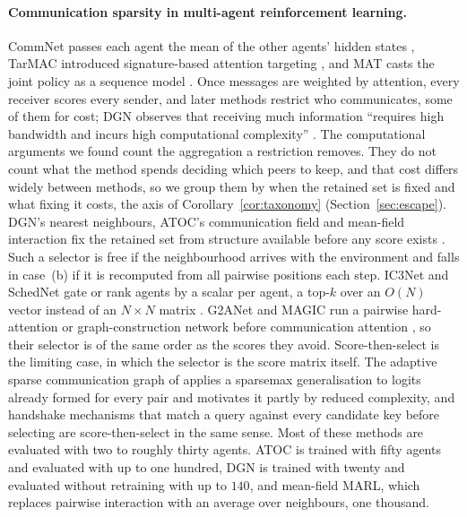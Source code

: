 \paragraph{Communication sparsity in multi-agent reinforcement learning.}
CommNet passes each agent the mean of the other agents' hidden states
\citep{sukhbaatar2016commnet}, TarMAC introduced signature-based attention
targeting \citep{das2019tarmac}, and MAT casts the joint policy as a sequence
model \citep{wen2022mat}. Once messages are weighted by attention, every
receiver scores every sender, and later methods restrict who communicates, some
of them for cost; DGN observes that receiving much information ``requires high
bandwidth and incurs high computational complexity'' \citep[p.~3]{jiang2018dgn}. The
computational arguments we found count the aggregation a restriction removes.
They do not count what the method spends deciding which peers to keep,
and that cost differs widely between methods, so we group them by when the
retained set is fixed and what fixing it costs, the axis of
Corollary~\ref{cor:taxonomy} (Section~\ref{sec:escape}). DGN's nearest
neighbours, ATOC's communication field and mean-field interaction fix the
retained set from structure available before any score exists
\citep{jiang2018dgn,jiang2018atoc,yang2018meanfield}. Such a selector is free if
the neighbourhood arrives with the environment and falls in case~(b) if it is
recomputed from all pairwise positions each step. IC3Net and SchedNet gate or
rank agents by a scalar per agent, a top-$k$ over an $O(N)$ vector instead of an
$N \times N$ matrix \citep{singh2018ic3net,kim2019schednet}. G2ANet and MAGIC
run a pairwise hard-attention or graph-construction network before
communication attention \citep{liu2020g2anet,niu2021magic}, so their selector
is of the same order as the scores they avoid. Score-then-select is the
limiting case, in which the selector is the score matrix itself. The adaptive
sparse communication graph of \citet{sun2020sparsecomm} applies a sparsemax
generalisation to logits already formed for every pair and motivates it partly
by reduced complexity, and handshake mechanisms that match a query against every
candidate key before selecting \citep{liu2020who2com} are score-then-select in
the same sense. Most of these methods are evaluated with two to roughly thirty
agents. ATOC is trained with fifty agents and evaluated with up to one hundred,
DGN is trained with twenty and evaluated without retraining with up to $140$, and
mean-field MARL, which
replaces pairwise interaction with an average over neighbours, one thousand.

